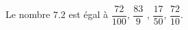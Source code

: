 
\begin{exercice}\label{exosmath-0792}

    Le nombre \( 7.2\) est égal à \( \dfrac{ 72 }{ 100 }\), $\dfrac{ 83 }{ 9 }$ , \( \dfrac{ 17 }{ 50 }\), \( \dfrac{ 72 }{ 10 }\).

\end{exercice}
